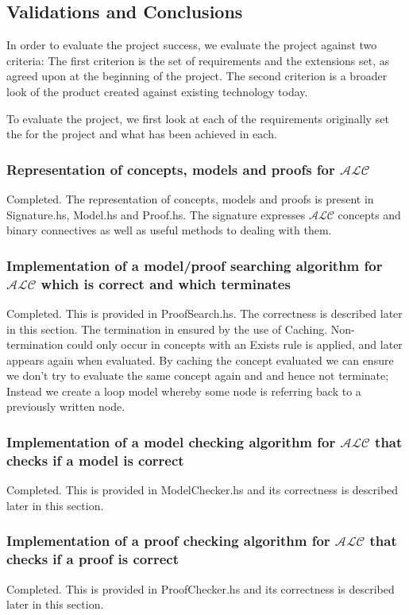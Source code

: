 \subsection {Validations and Conclusions}
\label{sec:valandconc}

In order to evaluate the project success, we evaluate the project against two criteria:
The first criterion is the set of requirements and the extensions set, as agreed upon at the beginning of the project.
The second criterion is a broader look of the product created against existing technology today.

To evaluate the project, we first look at each of the requirements originally set the for the project and what has been achieved in each.

\subsubsection*{Representation of concepts, models and proofs for $\mathcal{ALC}$}
Completed. The representation of concepts, models and proofs is present in Signature.hs, Model.hs and Proof.hs. The signature expresses $\mathcal{ALC}$ concepts and binary connectives as well as useful methods to dealing with them. 
\subsubsection*{Implementation of a model/proof searching algorithm for $\mathcal{ALC}$ which is correct and which terminates}
Completed. This is provided in ProofSearch.hs. The correctness is described later in this section. The termination in ensured by the use of Caching. Non-termination could only occur in concepts with an Exists rule is applied, and later appears again when evaluated. By caching the concept evaluated we can ensure we don't try to evaluate the same concept again and  and hence not terminate; Instead we create a loop model whereby some node is referring back to a previously written node.
\subsubsection*{Implementation of a model checking algorithm for $\mathcal{ALC}$ that checks if a model is correct}
Completed. This is provided in ModelChecker.hs and its correctness is described later in this section. 
\subsubsection*{Implementation of a proof checking algorithm for $\mathcal{ALC}$ that checks if a proof is correct}
Completed. This is provided in ProofChecker.hs and its correctness is described later in this section. 
